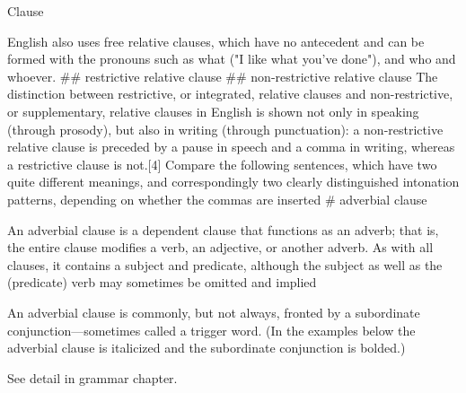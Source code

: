 \begin{writing}[18-8-24]{Clause}
\begin{easylist}[checklist]
{    English also uses free relative clauses, which have no antecedent and can be formed 
    with the pronouns such as what ("I like what you've done"), and who and whoever.
    }
## restrictive relative clause
## non-restrictive relative clause\newline
    {\color{gray}
    The distinction between restrictive, or integrated, relative clauses and non-restrictive, 
    or supplementary, relative clauses in English is shown not only in speaking (through 
    prosody), but also in writing (through punctuation): a non-restrictive relative 
    clause is preceded by a pause in speech and a comma in writing, whereas 
    a restrictive clause is not.[4] Compare the following sentences, which have 
    two quite different meanings, and correspondingly two clearly distinguished intonation patterns, depending on 
    whether the commas are inserted}
# adverbial clause\newline
    {\color{gray}
    An adverbial clause is a dependent clause that functions as an adverb; that is,
    the entire clause modifies a verb, an adjective, or another adverb. 
    As with all clauses, it contains a subject and predicate, although the subject 
    as well as the (predicate) verb may sometimes be omitted and implied 

    An adverbial clause is commonly, but not always, fronted by a subordinate conjunction—sometimes 
    called a trigger word. (In the examples below the adverbial clause is italicized 
    and the subordinate conjunction is bolded.)
    }
\end{easylist}
See detail in grammar chapter.
\end{writing}